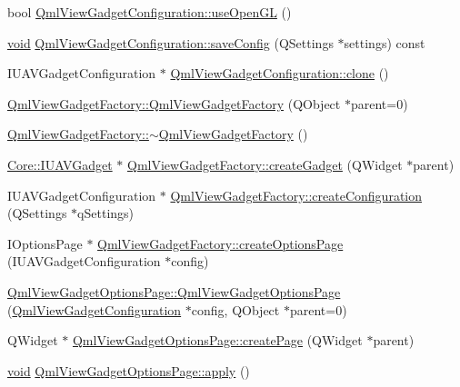 \begin{DoxyCompactItemize}
\item 
bool \hyperlink{group___o_p_map_plugin_ga64a5c04c8b5ac9f81ebeb1e573c1d1c7}{\-Qml\-View\-Gadget\-Configuration\-::use\-Open\-G\-L} ()
\item 
\hyperlink{group___u_a_v_objects_plugin_ga444cf2ff3f0ecbe028adce838d373f5c}{void} \hyperlink{group___o_p_map_plugin_gada9019ef4d25aa0e87788713af1d1d72}{\-Qml\-View\-Gadget\-Configuration\-::save\-Config} (\-Q\-Settings $\ast$settings) const 
\item 
\-I\-U\-A\-V\-Gadget\-Configuration $\ast$ \hyperlink{group___o_p_map_plugin_gab4f87dbc27b19e319ea02819e3574853}{\-Qml\-View\-Gadget\-Configuration\-::clone} ()
\item 
\hyperlink{group___o_p_map_plugin_ga84b7aa224d691ff4283bf3201a8f3b5e}{\-Qml\-View\-Gadget\-Factory\-::\-Qml\-View\-Gadget\-Factory} (\-Q\-Object $\ast$parent=0)
\item 
\hyperlink{group___o_p_map_plugin_ga2ae87f4b2a912a2e38fe69c6b8b3e3e7}{\-Qml\-View\-Gadget\-Factory\-::$\sim$\-Qml\-View\-Gadget\-Factory} ()
\item 
\hyperlink{class_core_1_1_i_u_a_v_gadget}{\-Core\-::\-I\-U\-A\-V\-Gadget} $\ast$ \hyperlink{group___o_p_map_plugin_gadceaaa6e9f968a951f33f6c1a7de1340}{\-Qml\-View\-Gadget\-Factory\-::create\-Gadget} (\-Q\-Widget $\ast$parent)
\item 
\-I\-U\-A\-V\-Gadget\-Configuration $\ast$ \hyperlink{group___o_p_map_plugin_ga9000c14dd19e5dbc8e5c8e2ed26b2553}{\-Qml\-View\-Gadget\-Factory\-::create\-Configuration} (\-Q\-Settings $\ast$q\-Settings)
\item 
\-I\-Options\-Page $\ast$ \hyperlink{group___o_p_map_plugin_gab0af6f5774c846fe82b1b073cf0bbb76}{\-Qml\-View\-Gadget\-Factory\-::create\-Options\-Page} (\-I\-U\-A\-V\-Gadget\-Configuration $\ast$config)
\item 
\hyperlink{group___o_p_map_plugin_gaf6860d14e2ae756100a2765d50a6d9b0}{\-Qml\-View\-Gadget\-Options\-Page\-::\-Qml\-View\-Gadget\-Options\-Page} (\hyperlink{class_qml_view_gadget_configuration}{\-Qml\-View\-Gadget\-Configuration} $\ast$config, \-Q\-Object $\ast$parent=0)
\item 
\-Q\-Widget $\ast$ \hyperlink{group___o_p_map_plugin_gabea978f47d48fc92ec7e5a0ed8d88fe0}{\-Qml\-View\-Gadget\-Options\-Page\-::create\-Page} (\-Q\-Widget $\ast$parent)
\item 
\hyperlink{group___u_a_v_objects_plugin_ga444cf2ff3f0ecbe028adce838d373f5c}{void} \hyperlink{group___o_p_map_plugin_gae54bde0f44f72b28df2d9722d829d930}{\-Qml\-View\-Gadget\-Options\-Page\-::apply} ()

\end{DoxyCompactItemize}
